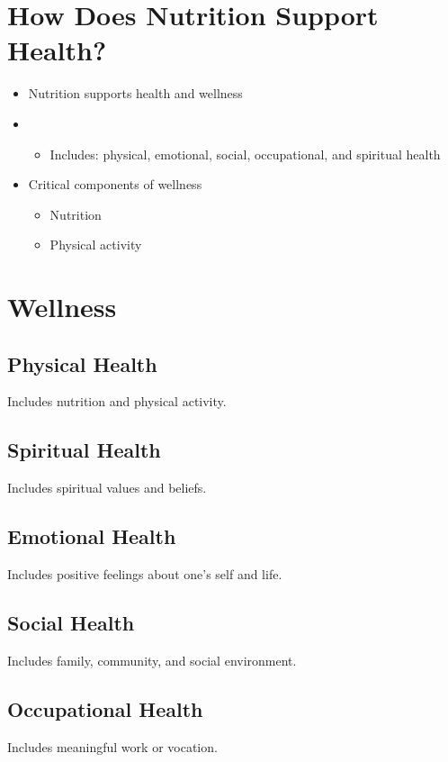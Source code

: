 \documentclass[title={Chapter 1}]{fdsn201notes}
\begin{document}
\section{How Does Nutrition Support Health?}\label{sec:how-does-nutrition-support-health?}
\begin{itemize}
	\item Nutrition supports health and wellness
	\item {}
	\begin{itemize}
		\item Includes: physical, emotional, social, occupational, and spiritual health
	\end{itemize}
	\item Critical components of wellness
	\begin{itemize}
		\item Nutrition
		\item Physical activity
	\end{itemize}
\end{itemize}

\section{Wellness}\label{sec:wellness}
\textcolor{healthpink}{\subsection{Physical Health}\label{subsec:physical-health}}
Includes nutrition and physical activity.
%
\textcolor{healthgreen}{\subsection{Spiritual Health}\label{subsec:spiritual-health}}
Includes spiritual values and beliefs.
%
\textcolor{healthblue}{\subsection{Emotional Health}\label{subsec:emotional-health}}
Includes positive feelings about one's self and life.
%
\textcolor{healthpurple}{\subsection{Social Health}\label{subsec:social-health}}
Includes family, community, and social environment.
%
\textcolor{healthorange}{\subsection{Occupational Health}\label{subsec:occupational-health}}
Includes meaningful work or vocation.
\end{document}
